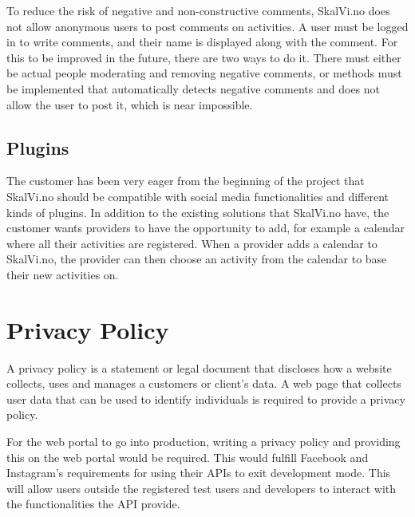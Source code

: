 To reduce the risk of negative and non-constructive comments, SkalVi.no does not allow anonymous users to post comments on activities. A user must be logged in to write comments, and their name is displayed along with the comment. For this to be improved in the future, there are two ways to do it. There must either be actual people moderating and removing negative comments, or methods must be implemented that automatically detects negative comments and does not allow the user to post it, which is near impossible.

\subsection{Plugins}
The customer has been very eager from the beginning of the project that SkalVi.no should be compatible with social media functionalities and different kinds of plugins. In addition to the existing solutions that SkalVi.no have, the customer wants providers to have the opportunity to add, for example a calendar where all their activities are registered. When a provider adds a calendar to SkalVi.no, the provider can then choose an activity from the calendar to base their new activities on.

\section{Privacy Policy}
A privacy policy is a statement or legal document that discloses how a website collects, uses and manages a customers or client's data. A web page that collects user data that can be used to identify individuals is required to provide a privacy policy.

For the web portal to go into production, writing a privacy policy and providing this on the web portal would be required. This would fulfill Facebook and Instagram's requirements for using their APIs to exit development mode. This will allow users outside the registered test users and developers to interact with the functionalities the API provide.

\cleardoublepage